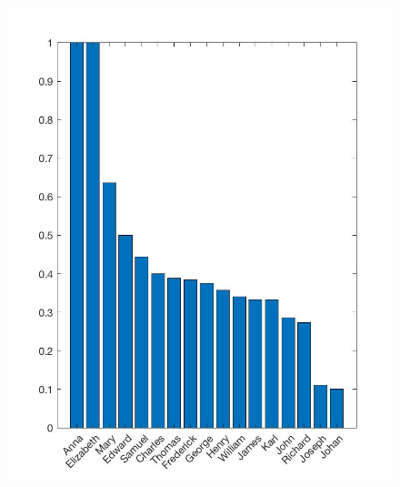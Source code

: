 \documentclass[12pt]{article}
\begin{document}
\begin{figure}[h!]
	\centering
	\includegraphics[scale=0.3]{LuckyNames.jpg}
\end{figure}
\end{document}
